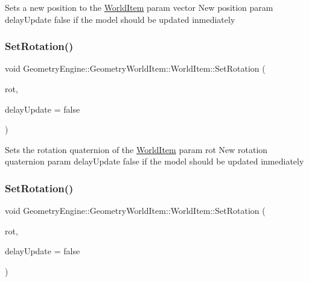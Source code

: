 Sets a new position to the \mbox{\hyperlink{class_geometry_engine_1_1_geometry_world_item_1_1_world_item}{World\+Item}} param vector New position param delay\+Update false if the model should be updated inmediately \mbox{\label{class_geometry_engine_1_1_geometry_world_item_1_1_world_item_ae8280e3f99ade1719aadc25b7bc999e9}} 
\subsubsection{\texorpdfstring{SetRotation()}{SetRotation()}\hspace{0.1cm}{\footnotesize\ttfamily [1/2]}}
{\footnotesize\ttfamily void Geometry\+Engine\+::\+Geometry\+World\+Item\+::\+World\+Item\+::\+Set\+Rotation (\begin{DoxyParamCaption}\item[{const Q\+Quaternion \&}]{rot,  }\item[{bool}]{delay\+Update = {\ttfamily false} }\end{DoxyParamCaption})}

Sets the rotation quaternion of the \mbox{\hyperlink{class_geometry_engine_1_1_geometry_world_item_1_1_world_item}{World\+Item}} param rot New rotation quaternion param delay\+Update false if the model should be updated inmediately \mbox{\label{class_geometry_engine_1_1_geometry_world_item_1_1_world_item_afe2d2f6812d148817f73c12a14218941}} 
\subsubsection{\texorpdfstring{SetRotation()}{SetRotation()}\hspace{0.1cm}{\footnotesize\ttfamily [2/2]}}
{\footnotesize\ttfamily void Geometry\+Engine\+::\+Geometry\+World\+Item\+::\+World\+Item\+::\+Set\+Rotation (\begin{DoxyParamCaption}\item[{const Q\+Vector3D \&}]{rot,  }\item[{bool}]{delay\+Update = {\ttfamily false} }\end{DoxyParamCaption})}

